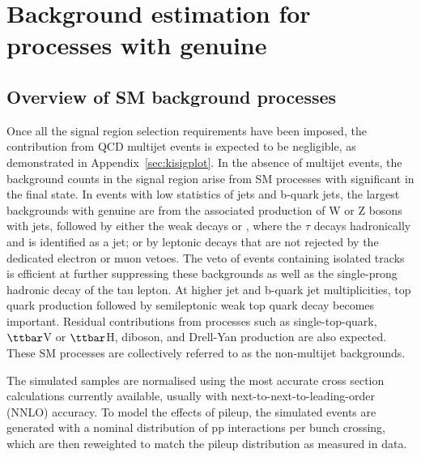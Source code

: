 
\section{Background estimation for processes with genuine \met}
\label{sec:backgroundmet}
\subsection{Overview of SM background processes}

Once all the signal region selection requirements have been imposed,
the contribution from QCD multijet events is expected to be
negligible, as demonstrated in Appendix~\ref{sec:kisigplot}. In the absence of
multijet events, the background counts in the signal region arise from
SM processes with significant \met in the final state. In events with
low statistics of jets and b-quark jets, the largest backgrounds with
genuine \met are from the associated production of W or Z bosons with
jets, followed by either the weak decays \znunu or \wtaunu, where the
$\tau$ decays hadronically and is identified as a jet; or by leptonic
decays that are not rejected by the dedicated electron or muon
vetoes. The veto of events containing isolated tracks is efficient at
further suppressing these backgrounds as well as the single-prong
hadronic decay of the tau lepton. At higher jet and b-quark jet
multiplicities, top quark production followed by semileptonic weak top
quark decay becomes important.  Residual contributions from processes
such as single-top-quark, $\ttbar$V or $\ttbar$H, diboson, and
Drell-Yan production are also expected. These SM processes are
collectively referred to as the non-multijet backgrounds.

The simulated samples are normalised using the most accurate cross
section calculations currently available, usually with
next-to-next-to-leading-order (NNLO) accuracy. To model the effects of
pileup, the simulated events are generated with a nominal distribution
of pp interactions per bunch crossing, which are then reweighted
to match the pileup distribution as measured in data. 

